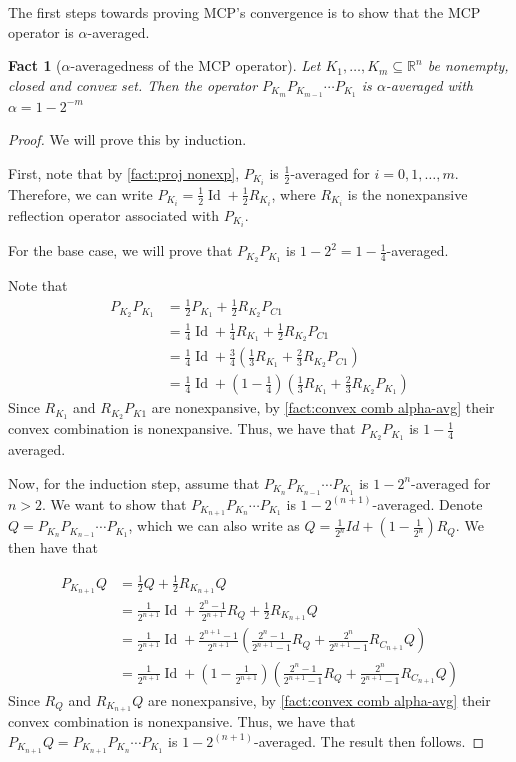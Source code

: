 \documentclass[smallextended,numbook,nospthms]{svjour3}
\theoremstyle{plain}
\newtheorem{fact}[theorem]{Fact}
\theoremstyle{definition}
\def\RR{\mathds R}
\DeclareMathOperator{\Id}{Id}
\begin{document}
The first steps towards proving MCP's convergence is to show that the MCP operator is $\alpha$-averaged.
\begin{fact}[$\alpha$-averagedness of the MCP operator]\label{fact:MCP alpha-avg}
	Let $K_{1}, \ldots, K_{m} \subseteq \RR^n$ be nonempty, closed and convex set. Then the operator $P_{K_{m}} P_{K_{m-1}} \cdots P_{K_{1}}$ is $\alpha$-averaged with $\alpha=1-2^{-m}$
\end{fact}
\begin{proof}
	We will prove this by induction. 
	
	First, note that by \cref{fact:proj nonexp}, $P_{K_{i}}$ is $\frac{1}{2}$-averaged for $i=0,1,\ldots,m$. Therefore, we can write $P_{K_{i}}=\frac{1}{2}\Id + \frac{1}{2}R_{K_{i}}$, where $R_{K_{i}}$ is the nonexpansive reflection operator associated with $P_{K_{i}}$.
	
	 For the base case, we will prove that $P_{K_{2}}P_{K_{1}}$ is $1-2^2=1-\frac{1}{4}$-averaged. 
	
	Note that
	\begin{align}
		P_{K_{2}}P_{K_{1}}&=\frac{1}{2} P_{K_{1}} + \frac{1}{2} R_{K_{2}}P_{C{1}} \\
		&=\frac{1}{4} \Id + \frac{1}{4} R_{K_{1}} + \frac{1}{2} R_{K_{2}}P_{C{1}} \\
		&=\frac{1}{4} \Id + \frac{3}{4} \left(\frac{1}{3} R_{K_{1}} + \frac{2}{3} R_{K_{2}}P_{C{1}}\right) \\
		&=\frac{1}{4} \Id + \left(1-\frac{1}{4}\right)\left(\frac{1}{3} R_{K_{1}} + \frac{2}{3} R_{K_{2}}P_{K_{1}}\right)
	\end{align}
	Since $R_{K_{1}}$ and $R_{K_{2}}P_{K{1}}$ are nonexpansive, by \cref{fact:convex comb alpha-avg} their convex combination is nonexpansive. Thus, we have that $P_{K_{2}}P_{K_{1}}$ is $1-\frac{1}{4}$ averaged.
	
	Now, for the induction step, assume that $P_{K_{n}} P_{K_{n-1}} \cdots P_{K_{1}}$ is $1-2^n$-averaged for $n > 2$. We want to show that $P_{K_{n+1}} P_{K_{n}} \cdots P_{K_{1}}$ is $1-2^{(n+1)}$-averaged. Denote $Q=P_{K_{n}} P_{K_{n-1}} \cdots P_{K_{1}}$, which we can also write as $Q = \frac{1}{2^{n}} Id + (1-\frac{1}{2^{n}})R_{Q}$. We then have that

	\begin{align}
		P_{K_{n+1}}Q&=\frac{1}{2} Q+\frac{1}{2} R_{K_{n+1}}Q \\
		&=\frac{1}{2^{n+1}}\Id + \frac{2^{n}-1}{2^{n+1}}R_{Q} + \frac{1}{2} R_{K_{n+1}}Q \\
		&=\frac{1}{2^{n+1}} \Id + \frac{2^{n+1}-1}{2^{n+1}}\left(\frac{2^{n}-1}{2^{n+1}-1}R_{Q} + \frac{2^{n}}{2^{n+1}-1}R_{C_{n+1}}Q \right) \\
		&=\frac{1}{2^{n+1}} \Id + \left(1-\frac{1}{2^{n+1}}\right)\left(\frac{2^{n}-1}{2^{n+1}-1}R_{Q} + \frac{2^{n}}{2^{n+1}-1}R_{C_{n+1}}Q \right)
	\end{align}
	Since $R_{Q}$ and $R_{K_{n+1}}Q$ are nonexpansive, by \cref{fact:convex comb alpha-avg} their convex combination is nonexpansive. Thus, we have that $P_{K_{n+1}}Q=P_{K_{n+1}} P_{K_{n}} \cdots P_{K_{1}}$ is $1-2^{(n+1)}$-averaged. The result then follows.	
\end{proof}
\end{document}
